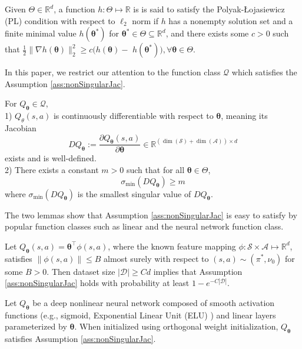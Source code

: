 \begin{defn} 
     Given $\Theta\in\mathbb{R}^d$, a function $h:\Theta\mapsto \mathbb{R}$ is is said to satisfy the Polyak-Łojasiewicz (PL) condition with respect to $\ell_2$ norm if $h$ has a nonempty solution set and a finite minimal value $h(\boldsymbol{\theta}^\ast)$ for $\boldsymbol{\theta}^\ast\in\Theta\subseteq \mathbb{R}^d$, and there exists some $c>0$ such that $\frac{1}{2}\|\nabla h(\boldsymbol{\theta})\|^2_2 \geq  c(h(\boldsymbol{\theta})-$ $h(\boldsymbol{\theta}^\ast)), \forall \boldsymbol{\theta}\in\Theta$.
\end{defn}

\noindent In this paper, we restrict our attention to the function class $\mathcal{Q}$ which satisfies the Assumption \ref{ass:nonSingularJac}.

\begin{asmp}\label{ass:nonSingularJac} 
\; For $Q_{\boldsymbol{\theta}}\in\mathcal{Q}$,
\\
1) $Q_\theta(s, a)$ is continuously differentiable with respect to $\boldsymbol{\theta}$, meaning its Jacobian
$$
D Q_{\boldsymbol{\theta}}:=\frac{\partial Q_{\boldsymbol{\theta}}(s, a)}{\partial \boldsymbol{\theta}} \in \mathbb{R}^{(\operatorname{dim}(\mathcal{S})+ \operatorname{dim}(\mathcal{A})) \times d}
$$
exists and is well-defined.
\\
2) There exists a constant $m>0$ such that for all $\boldsymbol{\theta}\in\Theta$,
$$
\sigma_{\min }\left(D Q_{\boldsymbol{\theta}}\right) \geq m
$$
where $\sigma_{\min }\left(D Q_{\boldsymbol{\theta}}\right)$ is the smallest singular value of $D Q_{\boldsymbol{\theta}}$.
\end{asmp}
\noindent The two lemmas show that Assumption \ref{ass:nonSingularJac} is easy to satisfy by popular function classes such as linear and the neural network function class.
\begin{lem}\label{lem:linPolyNonsingular}
    Let $Q_{\boldsymbol{\theta}}(s, a)=\boldsymbol{\theta}^{\top} \phi(s, a)$, where the known feature mapping $\phi:\mathcal{S}\times \mathcal{A} \mapsto \mathbb{R}^d$, satisfies $\|\phi(s, a)\| \leq B$ almost surely with respect to $(s,a)\sim (\pi^\ast, \nu_0)$ for some $B>0$.  Then dataset size $|\mathcal{D}|\ge Cd$ implies that Assumption \ref{ass:nonSingularJac} holds with probability at least $1-e^{-C |\mathcal{D}|}$.
\end{lem}
\begin{lem}
\label{lem:NNenjoysPL}
    Let $Q_{\boldsymbol{\theta}}$ be a deep nonlinear neural network composed of smooth activation functions (e.g., sigmoid, Exponential Linear Unit (ELU) \citep{clevert2015fast}) and linear layers parameterized by $\boldsymbol{\theta}$. When initialized using orthogonal weight initialization, $Q_{\boldsymbol{\theta}}$ satisfies Assumption \ref{ass:nonSingularJac}.
\end{lem}



